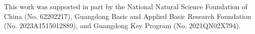 \documentclass[sigconf]{acmart}
\begin{document}
\begin{acks}
This work was supported in part by the National Natural Science Foundation of China (No. 62202217), Guangdong Basic and Applied Basic Research Foundation (No. 2023A1515012889), and Guangdong Key Program (No. 2021QN02X794).
\end{acks}




\end{document}
